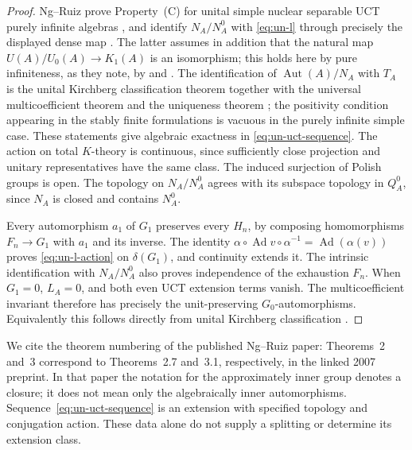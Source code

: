 \begin{proof}
Ng--Ruiz prove Property~(C) for unital simple nuclear separable UCT
purely infinite algebras \cite[Theorem~3]{NgRuiz2008}, and identify
\(N_A/N_A^0\) with \eqref{eq:un-l} through precisely the displayed dense map
\cite[Theorem~2]{NgRuiz2008}. The latter assumes in addition that the natural map
\(U(A)/U_0(A)\to K_1(A)\) is an isomorphism; this holds here by pure
infiniteness, as they note, by \cite{Cuntz1981} and
\cite[Proposition~8.1.4]{Blackadar1998}.
The identification of \(\operatorname{Aut}(A)/N_A\) with \(T_A\) is the unital
Kirchberg classification theorem \cite[Theorem~4.2.1 and
Corollary~4.2.2]{Phillips2000} together with the universal multicoefficient
theorem \cite{DadarlatLoring1996} and the uniqueness theorem
\cite[Theorem~5.1(a)]{Dadarlat2005}; the positivity condition appearing in
the stably finite formulations is vacuous in the purely infinite simple
case.
These statements give algebraic exactness in \eqref{eq:un-uct-sequence}.
The action on total \(K\)-theory is continuous, since sufficiently
close projection and unitary representatives have the same class.
The induced surjection of Polish groups is open.
The topology on \(N_A/N_A^0\) agrees with its subspace topology in \(Q_A^0\),
since \(N_A\) is closed and contains \(N_A^0\).

Every automorphism \(a_1\) of \(G_1\) preserves every \(H_n\), by
composing homomorphisms \(F_n\to G_1\) with \(a_1\) and its inverse.
The identity
\(\alpha\circ\operatorname{Ad} v\circ\alpha^{-1}=\operatorname{Ad}(\alpha(v))\) proves
\eqref{eq:un-l-action} on \(\delta(G_1)\), and continuity extends it.
The intrinsic identification with \(N_A/N_A^0\) also proves independence
of the exhaustion \(F_n\).
When \(G_1=0\), \(L_A=0\), and both even UCT extension terms
vanish. The multicoefficient invariant therefore has precisely the
unit-preserving \(G_0\)-automorphisms. Equivalently this follows
directly from unital Kirchberg classification \cite{RosenbergSchochet1987,Phillips2000}.
\end{proof}

\begin{remark}\label{rem:un-remark-1}
We cite the theorem numbering of the published Ng--Ruiz paper:
Theorems~2 and~3 correspond to Theorems~2.7 and~3.1, respectively,
in the linked 2007 preprint. In that paper the notation for
the approximately inner group denotes a closure; it does not mean only
the algebraically inner automorphisms.
Sequence~\eqref{eq:un-uct-sequence} is an extension with specified
topology and conjugation action. These data alone do not supply a
splitting or determine its extension class.
\end{remark}

